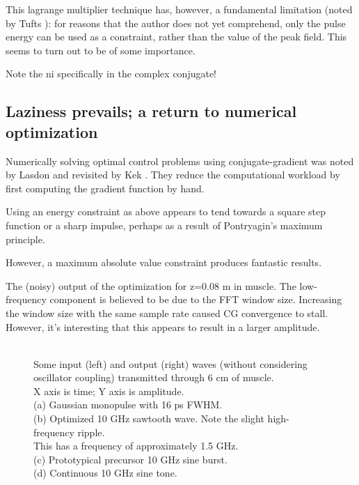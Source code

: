 \documentclass[paper.tex]{subfiles}
\begin{document}
This lagrange multiplier technique has, however, a fundamental limitation (noted by Tufts \cite{Optimum1964}): for reasons that the author does not yet comprehend, only the pulse energy can be used as a constraint, rather than the value of the peak field. This seems to turn out to be of some importance.


Note the ni specifically in the complex conjugate!


\subsection{Laziness prevails; a return to numerical optimization}

Numerically solving optimal control problems using conjugate-gradient was noted by Lasdon \cite{conjugate1967} and 
revisited by Kek \cite{Conjugate}. They reduce the computational workload by first computing the 
gradient function by hand.

Using an energy constraint as above appears to tend towards a square step function or a sharp impulse, perhaps as a result of Pontryagin's maximum principle\cite{Optimum1964}.


However, a maximum absolute value constraint produces fantastic results.


\begin{figure}[H]
	
	\caption{}
\end{figure}


The (noisy) output of the optimization for z=0.08 m in muscle. The low-frequency component is believed to be due to the FFT window size. Increasing the window size with the same sample rate caused CG convergence to stall. However, it's interesting that this appears to result in a larger amplitude. 


\begin{figure}[H]
	
	\caption{}
\end{figure}


\begin{figure}[H]
	
	\caption{\\
		Some input (left) and output (right) waves (without considering oscillator coupling) transmitted through 6 cm of muscle.\\
		X axis is time; Y axis is amplitude.\\
		(a) Gaussian monopulse with 16 ps FWHM.\\
		(b) Optimized 10 GHz sawtooth wave. Note the slight high-frequency ripple.\\ This has a frequency of approximately 1.5 GHz.\\
		(c) Prototypical precursor 10 GHz sine burst.\\
		(d) Continuous 10 GHz sine tone.
}
\end{figure}
\end{document}

